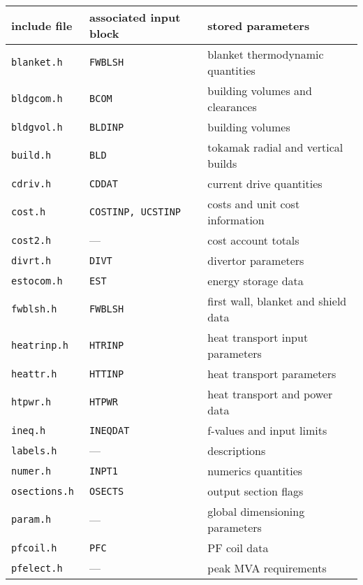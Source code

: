 
\begin{table}
\begin{center}

\begin{tabular}{||l|l||l||} \hline
include file    & associated input block & stored parameters \\ \hline
\tt blanket.h   & \tt FWBLSH           & blanket thermodynamic quantities \\
\tt bldgcom.h   & \tt BCOM             & building volumes and clearances \\
\tt bldgvol.h   & \tt BLDINP           & building volumes \\
\tt build.h     & \tt BLD              & tokamak radial and vertical builds \\
\tt cdriv.h     & \tt CDDAT            & current drive quantities \\
\tt cost.h      & \tt COSTINP, UCSTINP & costs and unit cost information \\
\tt cost2.h     &     ---              & cost account totals \\
\tt divrt.h     & \tt DIVT             & divertor parameters \\
\tt estocom.h   & \tt EST              & energy storage data \\
\tt fwblsh.h    & \tt FWBLSH           & first wall, blanket and shield data \\
\tt heatrinp.h  & \tt HTRINP           & heat transport input parameters \\
\tt heattr.h    & \tt HTTINP           & heat transport parameters \\
\tt htpwr.h     & \tt HTPWR            & heat transport and power data \\
\tt ineq.h      & \tt INEQDAT          & f-values and input limits \\
\tt labels.h    &     ---              & descriptions \\
\tt numer.h     & \tt INPT1            & numerics quantities \\
\tt osections.h & \tt OSECTS           & output section flags \\
\tt param.h     &     ---              & global dimensioning parameters \\
\tt pfcoil.h    & \tt PFC              & PF coil data \\
\tt pfelect.h   &     ---              & peak MVA requirements \\

\end{tabular}
\end{center}
\end{table}
